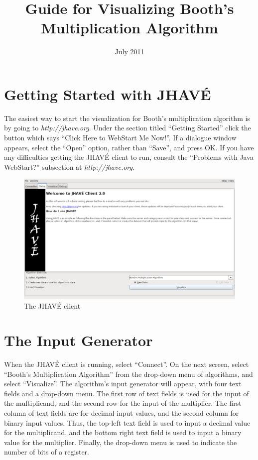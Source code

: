 \documentclass{article}
\title{Guide for Visualizing Booth's Multiplication Algorithm}
\date{July 2011}
\begin{document}
\section{Getting Started with JHAVÉ}
The easiest way to start the visualization for Booth's multiplication algorithm is by going to \emph{http://jhave.org}.
Under the section titled ``Getting Started'' click the button which says ``Click Here to WebStart Me Now!''.
If a dialogue window appears, select the ``Open'' option, rather than ``Save'', and press OK.
If you have any difficulties getting the JHAVÉ client to run, consult the ``Problems with Java WebStart?'' subsection at \emph{http://jhave.org}.

\begin{figure}[h]
\centering
\includegraphics[scale=0.3]{start.pdf}
\caption{The JHAVÉ client}
\end{figure}

\section{The Input Generator}

When the JHAVÉ client is running, select ``Connect''.
On the next screen, select ``Booth's Multiplication Algorithm'' from the drop-down menu of algorithms, and select ``Visualize''.
The algorithm's input generator will appear, with four text fields and a drop-down menu.
The first row of text fields is used for the input of the multiplicand, and the second row for the input of the multiplier.
The first column of text fields are for decimal input values, and the second column for binary input values.
Thus, the top-left text field is used to input a decimal value for the multiplicand, and the bottom right text field is used to input a binary value for the multiplier.
Finally, the drop-down menu is used to indicate the number of bits of a register.
\end{document}
